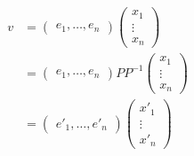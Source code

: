 \documentclass{book}
\begin{document}
        \begin{align*}
            v &= 
            \begin{pmatrix}
                e_1,\dots,e_n
            \end{pmatrix}
            \begin{pmatrix}
                x_1 \\ \vdots \\ x_n
            \end{pmatrix} \\ &= 
            \begin{pmatrix}
                e_1,\dots,e_n
            \end{pmatrix}PP^{-1}
            \begin{pmatrix}
                x_1 \\ \vdots \\ x_n
            \end{pmatrix} \\ &= 
            \begin{pmatrix}
                {e'}_1,\dots,{e'}_n
            \end{pmatrix}
            \begin{pmatrix}
                {x'}_1 \\ \vdots \\ {x'}_n
            \end{pmatrix}
        \end{align*}
\end{document}

